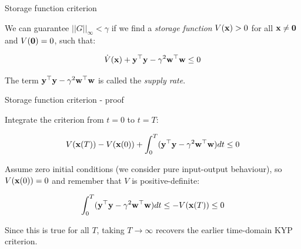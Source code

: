 \documentclass{beamer}
\begin{document}
	
	
	
	\begin{frame}{Storage function criterion}
		\begin{flushleft}
			
			We can guarantee $||G||_\infty < \gamma$ if we find a \emph{storage function} $V( \mathbf{x}) > 0$ for all $\mathbf{x} \neq \mathbf{0}$ and $V(\mathbf{0}) = 0$, such that:
			
			\begin{equation}
				\dot V(\mathbf{x}) + \mathbf{y}^\top \mathbf{y} - \gamma^2 \mathbf{w}^\top \mathbf{w} \leq 0
			\end{equation}
			
			The term $\mathbf{y}^\top \mathbf{y} - \gamma^2 \mathbf{w}^\top \mathbf{w} $ is called the \emph{supply rate}.
			
		\end{flushleft}
	\end{frame}
	
	
	\begin{frame}{Storage function criterion - proof}
		\begin{flushleft}
			
			Integrate the criterion from $t=0$ to $t = T$:
			
			\begin{equation}
				V(\mathbf{x}(T)) - V(\mathbf{x}(0)) + \int_{0}^{T}( \mathbf{y}^\top \mathbf{y} - \gamma^2 \mathbf{w}^\top \mathbf{w}) dt \leq 0
			\end{equation}
			
			Assume zero initial conditions (we consider pure input-output behaviour), so $V(\mathbf{x}(0)) = 0$ and remember that $V$ is positive-definite:
			
			\begin{equation}
				\int_{0}^{T} (\mathbf{y}^\top \mathbf{y} - \gamma^2 \mathbf{w}^\top \mathbf{w})dt  \leq  -V(\mathbf{x}(T)) \leq 0
			\end{equation}
			
			Since this is true for all $T$, taking $T \rightarrow \infty$ recovers the earlier time-domain KYP criterion.
			
		\end{flushleft}
	\end{frame}
	
	
	
\end{document}
